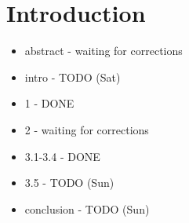 \chapter*{Introduction}

\begin{itemize}
\huge \color{red}
\item abstract - waiting for corrections
\item intro - TODO (Sat)
\item 1 - DONE
\item 2 - waiting for corrections
\item 3.1-3.4 - DONE
\item 3.5 - TODO (Sun)
\item conclusion - TODO (Sun)
\end{itemize}
